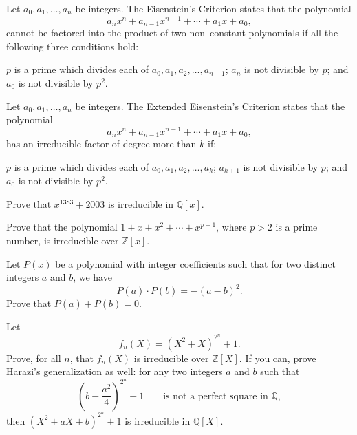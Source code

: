 \begin{tcolorbox}[title={Eisenstein's Criterion \& Extension}]
    \begin{theorem}
        Let $a_0, a_1, \dots ,a_n$ be integers. The Eisenstein's Criterion states that the polynomial \[a_nx^n+a_{n-1}x^{n-1}+ \cdots + a_1x+a_0,\] cannot be factored into the product of two non--constant polynomials if all the following three conditions hold:
        \begin{tasks}
            \task $p$ is a prime which divides each of $a_0,a_1,a_2,\dots,a_{n-1}$;
            \task $a_n$ is not divisible by $p$; and
            \task $a_0$ is not divisible by $p^2$.
        \end{tasks}
    \end{theorem}

    \begin{theorem}
        Let $a_0, a_1, \dots ,a_n$ be integers. The Extended Eisenstein's Criterion states that the polynomial \[a_nx^n+a_{n-1}x^{n-1}+ \cdots + a_1x+a_0,\]
        has an irreducible factor of degree more than $k$ if:
        \begin{tasks}
            \task $p$ is a prime which divides each of $a_0,a_1,a_2,\dots,a_{k}$;
            \task $a_{k+1}$ is not divisible by $p$; and
            \task $a_0$ is not divisible by $p^2$.
        \end{tasks}
    \end{theorem}
\end{tcolorbox}


\begin{question}
    Prove that $x^{1383}+2003$ is irreducible in $\mathbb Q[x]$.
\end{question}

\begin{question}
    Prove that the polynomial $1+x+x^2+\cdots+x^{p-1}$, where $p>2$ is a prime number, is irreducible over $\mathbb Z[x]$.
\end{question}

\begin{question}[name={1997 Iran Third Round}]
    Let $P(x)$ be a polynomial with integer coefficients such that for two distinct integers $a$ and $b$, we have \[P(a) \cdot P(b) = -(a-b)^2.\] Prove that $P(a)+P(b)=0$.
\end{question}


\begin{question}[name={1998 Romanian TST}]
    Let $$f_n(X) = (X^2 + X)^{2^n} +1.$$ Prove, for all $n$, that $f_n (X)$ is irreducible over $\mathbb Z[X]$. If you can, prove Harazi's generalization as well: for any two integers $a$ and $b$  such that \[\left(b-\frac{a^{2}}{4}\right)^{2^{n}}+1 \qquad \text{is not a perfect square in } \mathbb Q,\] then $(X^{2}+aX+b)^{2^{n}}+1$ is irreducible in $\mathbb{Q}[X]$.
\end{question}


